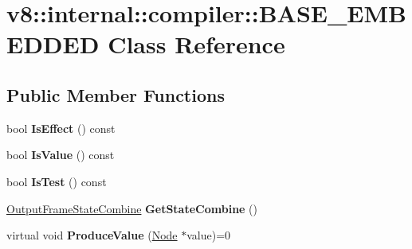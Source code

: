 \hypertarget{classv8_1_1internal_1_1compiler_1_1_b_a_s_e___e_m_b_e_d_d_e_d}{}\section{v8\+:\+:internal\+:\+:compiler\+:\+:B\+A\+S\+E\+\_\+\+E\+M\+B\+E\+D\+D\+ED Class Reference}
\label{classv8_1_1internal_1_1compiler_1_1_b_a_s_e___e_m_b_e_d_d_e_d}
\subsection*{Public Member Functions}
\begin{DoxyCompactItemize}
\item 
bool {\bfseries Is\+Effect} () const \hypertarget{classv8_1_1internal_1_1compiler_1_1_b_a_s_e___e_m_b_e_d_d_e_d_a699c48e07f64a6cec4beb709a26317b4}{}\label{classv8_1_1internal_1_1compiler_1_1_b_a_s_e___e_m_b_e_d_d_e_d_a699c48e07f64a6cec4beb709a26317b4}

\item 
bool {\bfseries Is\+Value} () const \hypertarget{classv8_1_1internal_1_1compiler_1_1_b_a_s_e___e_m_b_e_d_d_e_d_a766302be0fa5a62d28bc73d384f02bc0}{}\label{classv8_1_1internal_1_1compiler_1_1_b_a_s_e___e_m_b_e_d_d_e_d_a766302be0fa5a62d28bc73d384f02bc0}

\item 
bool {\bfseries Is\+Test} () const \hypertarget{classv8_1_1internal_1_1compiler_1_1_b_a_s_e___e_m_b_e_d_d_e_d_a79c138560cb60a4750e951f543fa82fe}{}\label{classv8_1_1internal_1_1compiler_1_1_b_a_s_e___e_m_b_e_d_d_e_d_a79c138560cb60a4750e951f543fa82fe}

\item 
\hyperlink{classv8_1_1internal_1_1compiler_1_1_output_frame_state_combine}{Output\+Frame\+State\+Combine} {\bfseries Get\+State\+Combine} ()\hypertarget{classv8_1_1internal_1_1compiler_1_1_b_a_s_e___e_m_b_e_d_d_e_d_aa55a77dd85adb86065397b45bd127737}{}\label{classv8_1_1internal_1_1compiler_1_1_b_a_s_e___e_m_b_e_d_d_e_d_aa55a77dd85adb86065397b45bd127737}

\item 
virtual void {\bfseries Produce\+Value} (\hyperlink{classv8_1_1internal_1_1compiler_1_1_node}{Node} $\ast$value)=0\hypertarget{classv8_1_1internal_1_1compiler_1_1_b_a_s_e___e_m_b_e_d_d_e_d_a85f3ba1c9810ba6ab5a0b81711ae1a53}{}\label{classv8_1_1internal_1_1compiler_1_1_b_a_s_e___e_m_b_e_d_d_e_d_a85f3ba1c9810ba6ab5a0b81711ae1a53}


\end{DoxyCompactItemize}
